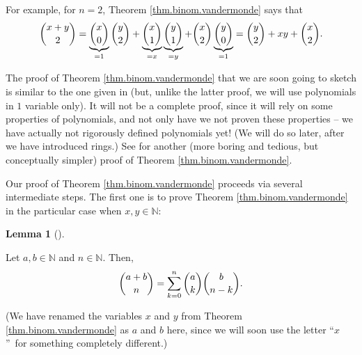 \documentclass[numbers=enddot,12pt,final,onecolumn,notitlepage]{scrartcl}%
\numberwithin{exer}{subsection}
\theoremstyle{definition}
\newtheorem{lem}[theo]{Lemma}
\newenvironment{lemma}[1][]
{\begin{lem}[#1]\begin{leftbar}}
{\end{leftbar}\end{lem}}
\let\sumnonlimits\sum
\renewcommand{\sum}{\sumnonlimits\limits}
\begin{document}
For example, for $n=2$, Theorem \ref{thm.binom.vandermonde} says that
\[
\dbinom{x+y}{2}=\underbrace{\dbinom{x}{0}}_{=1}\dbinom{y}{2}%
+\underbrace{\dbinom{x}{1}}_{=x}\underbrace{\dbinom{y}{1}}_{=y}+\dbinom{x}%
{2}\underbrace{\dbinom{y}{0}}_{=1}=\dbinom{y}{2}+xy+\dbinom{x}{2}.
\]


The proof of Theorem \ref{thm.binom.vandermonde} that we are soon going to
sketch is similar to the one given in \cite[\S 3.3.3]{detnotes} (but, unlike
the latter proof, we will use polynomials in $1$ variable only). It will not
be a complete proof, since it will rely on some properties of polynomials, and
not only have we not proven these properties -- we have actually not
rigorously defined polynomials yet! (We will do so later, after we have
introduced rings.) See \cite[\S 3.3.2]{detnotes} for another (more boring and
tedious, but conceptually simpler) proof of Theorem
\ref{thm.binom.vandermonde}.

Our proof of Theorem \ref{thm.binom.vandermonde} proceeds via several
intermediate steps. The first one is to prove Theorem
\ref{thm.binom.vandermonde} in the particular case when $x,y\in\mathbb{N}$:

\begin{lemma}
\label{lem.binom.vandermonde.NN}Let $a,b\in\mathbb{N}$ and $n\in\mathbb{N}$.
Then,%
\[
\dbinom{a+b}{n}=\sum_{k=0}^{n}\dbinom{a}{k}\dbinom{b}{n-k}.
\]

\end{lemma}

(We have renamed the variables $x$ and $y$ from Theorem
\ref{thm.binom.vandermonde} as $a$ and $b$ here, since we will soon use the
letter \textquotedblleft$x$\textquotedblright\ for something completely different.)
\end{document}
